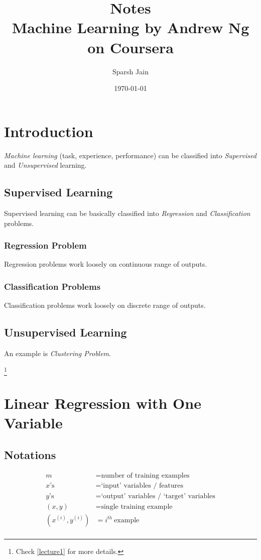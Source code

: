 \documentclass[a4paper, 12pt]{report}
\title{Notes\\
\large Machine Learning by Andrew Ng on Coursera}
\author{Sparsh Jain}
\date{\today}
\newcommand\blfootnote[1]{
	\begingroup
	\renewcommand\thefootnote{}\footnote{#1}
	\addtocounter{footnote}{-1}
	\endgroup
}
\begin{document}
\maketitle
\tableofcontents

\chapter{Introduction}
\emph{Machine learning} (task, experience, performance) can be classified into
\emph{Supervised} and \emph{Unsupervised} learning.

\section{Supervised Learning}
Supervised learning can be basically classified into \emph{Regression} and
\emph{Classification} problems.

\subsection{Regression Problem}
Regression problems work loosely on continuous range of outputs.

\subsection{Classification Problems}
Classification problems work loosely on discrete range of outputs.

\section{Unsupervised Learning}
An example is \emph{Clustering Problem}.

\blfootnote{Check \autoref{lecture1} for more details.}

\chapter{Linear Regression with One Variable}

\section{Notations}
\begin{align*}
	m                  & = \text{number of training examples}             \\
	x\text{'s}         & = \text{`input' variables / features}            \\
	y\text{'s}         & = \text{`output' variables / `target' variables} \\
	(x, y)             & = \text{single training example}                 \\
	(x^{(i)}, y^{(i)}) & = i^{th} \  \text{example}                       \\
\end{align*}
\end{document}
